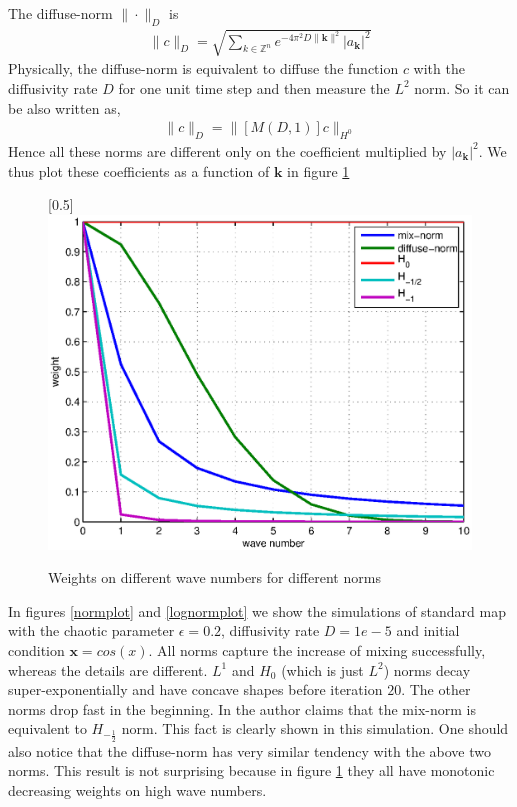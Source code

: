 \documentclass{article}
\begin{document}
The diffuse-norm $\|\cdot\|_D$ is
\begin{eqnarray}
  \|c\|_D = \sqrt{\sum_{k \in \mathbb{Z}^n} e^{-4 \pi^2 D \|\mathbf{k}\|^2} |a_{\mathbf{k}} |^2   }
\end{eqnarray}
Physically, the diffuse-norm is equivalent to diffuse the function $c$ with the diffusivity rate $D$ for one unit time step and then measure the $L^2$ norm. So it can be also written as,
\begin{eqnarray}
  \|c\|_D = \|[M(D,1)] c \|_{H^0}
\end{eqnarray}
Hence all these norms are different only on the coefficient multiplied by $|a_{\mathbf{k}} |^2$. We thus plot these coefficients as a function of $\mathbf{k}$ in figure \ref{normcompare}

\begin{figure}
\caption{\label{normcompare} Weights on different wave numbers for different norms}
\centerline{\scalebox{0.5}[0.5]{\includegraphics{normcompare.eps} }}
\end{figure}

In figures \ref{normplot} and \ref{lognormplot} we show the simulations of standard map with the chaotic parameter $\epsilon =0.2$, diffusivity rate $D = 1e-5$ and initial condition $\mathbf{x} = cos(x)$. All norms capture the increase of mixing successfully, whereas the details are different. $L^1$ and $H_0$ (which is just $L^2$) norms decay super-exponentially and have concave shapes before iteration $20$. The other norms drop fast in the beginning. In \cite{Mezic2005} the author claims that the mix-norm is equivalent to $H_{-\frac{1}{2}}$ norm. This fact is clearly shown in this simulation. One should also notice that the diffuse-norm has very similar tendency with the above two norms. This result is not surprising because in figure \ref{normcompare} they all have monotonic decreasing weights on high wave numbers.
\end{document}
